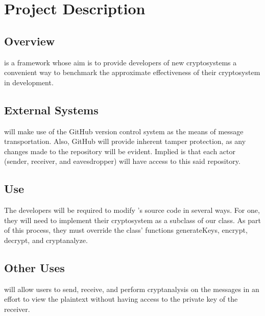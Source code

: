\section{Project Description}
\md \bigskip



\subsection{Overview}
\cry{} is a framework whose aim is to provide developers of
new cryptosystems a convenient way to benchmark the
approximate effectiveness of their cryptosystem in
development.

\subsection{External Systems}
\cry{} will make use of the GitHub version control system
as the means of message transportation. Also, GitHub will
provide inherent tamper protection, as any changes made
to the repository will be evident. Implied is that each
actor (sender, receiver, and eavesdropper) will have access
to this said repository.

\subsection{Use}
The developers will be required to modify \cry's source
code in several ways. For one, they will need to implement
their cryptosystem as a subclass of our 
class. As part of this process, they must override the
 class' functions generateKeys, encrypt,
decrypt, and cryptanalyze.

\subsection{Other Uses}
\cry{} will allow users to send, receive, and perform
cryptanalysis on the messages in an effort to view the
plaintext without having access to the private key of
the receiver.
